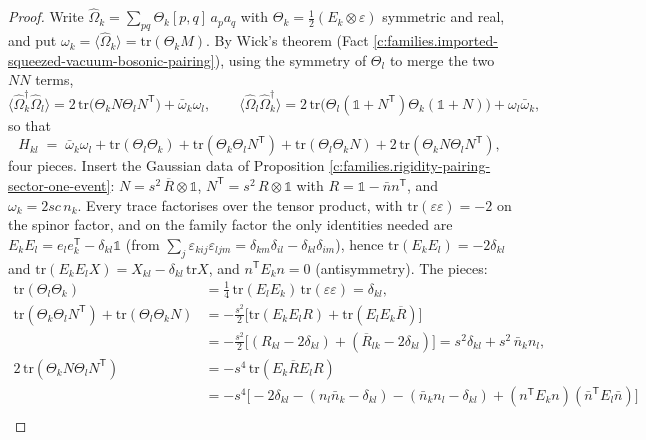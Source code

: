 \documentclass[11pt]{article}
\theoremstyle{definition}
\theoremstyle{plain}
\begin{document}
\begin{proof}
Write $\hat\Omega_{k} = \sum_{pq}\Theta_{k}[p,q]\,a_{p}a_{q}$ with $\Theta_{k} = \tfrac12(E_{k} \otimes \varepsilon)$ symmetric and real, and put $\omega_{k} = \langle\hat\Omega_{k}\rangle = \mathrm{tr}(\Theta_{k}M)$. By Wick's theorem (Fact \ref{c:families.imported-squeezed-vacuum-bosonic-pairing}), using the symmetry of $\Theta_{l}$ to merge the two $NN$ terms,
\[
\langle\hat\Omega_{k}^{\dagger}\hat\Omega_{l}\rangle = 2\,\mathrm{tr}\bigl(\Theta_{k}N\Theta_{l}N^{\mathsf{T}}\bigr) + \bar\omega_{k}\omega_{l}, \qquad
\langle\hat\Omega_{l}\hat\Omega_{k}^{\dagger}\rangle = 2\,\mathrm{tr}\bigl(\Theta_{l}(\mathbb{1}+N^{\mathsf{T}})\Theta_{k}(\mathbb{1}+N)\bigr) + \omega_{l}\bar\omega_{k},
\]
so that
\[
H_{kl} \;=\; \bar\omega_{k}\omega_{l} + \mathrm{tr}(\Theta_{l}\Theta_{k}) + \mathrm{tr}(\Theta_{k}\Theta_{l}N^{\mathsf{T}}) + \mathrm{tr}(\Theta_{l}\Theta_{k}N) + 2\,\mathrm{tr}(\Theta_{k}N\Theta_{l}N^{\mathsf{T}}),
\]
four pieces. Insert the Gaussian data of Proposition \ref{c:families.rigidity-pairing-sector-one-event}: $N = s^{2}\,\overline{R} \otimes \mathbb{1}$, $N^{\mathsf{T}} = s^{2}\,R \otimes \mathbb{1}$ with $R = \mathbb{1} - \bar{n}n^{\mathsf{T}}$, and $\omega_{k} = 2sc\,n_{k}$. Every trace factorises over the tensor product, with $\mathrm{tr}(\varepsilon\varepsilon) = -2$ on the spinor factor, and on the family factor the only identities needed are $E_{k}E_{l} = e_{l}e_{k}^{\mathsf{T}} - \delta_{kl}\mathbb{1}$ (from $\sum_{j}\varepsilon_{kij}\varepsilon_{ljm} = \delta_{km}\delta_{il} - \delta_{kl}\delta_{im}$), hence $\mathrm{tr}(E_{k}E_{l}) = -2\delta_{kl}$ and $\mathrm{tr}(E_{k}E_{l}X) = X_{kl} - \delta_{kl}\,\mathrm{tr}X$, and $n^{\mathsf{T}}E_{k}n = 0$ (antisymmetry). The pieces:
\begin{align*}
\mathrm{tr}(\Theta_{l}\Theta_{k}) &= \tfrac14\,\mathrm{tr}(E_{l}E_{k})\,\mathrm{tr}(\varepsilon\varepsilon) = \delta_{kl},\\
\mathrm{tr}(\Theta_{k}\Theta_{l}N^{\mathsf{T}}) + \mathrm{tr}(\Theta_{l}\Theta_{k}N) &= -\tfrac{s^{2}}{2}\bigl[\mathrm{tr}(E_{k}E_{l}R) + \mathrm{tr}(E_{l}E_{k}\overline{R})\bigr]\\
&= -\tfrac{s^{2}}{2}\bigl[(R_{kl} - 2\delta_{kl}) + (\overline{R}_{lk} - 2\delta_{kl})\bigr] = s^{2}\delta_{kl} + s^{2}\,\bar{n}_{k}n_{l},\\
2\,\mathrm{tr}(\Theta_{k}N\Theta_{l}N^{\mathsf{T}}) &= -s^{4}\,\mathrm{tr}(E_{k}\overline{R}E_{l}R)\\
&= -s^{4}\bigl[-2\delta_{kl} - (n_{l}\bar{n}_{k} - \delta_{kl}) - (\bar{n}_{k}n_{l} - \delta_{kl}) + (n^{\mathsf{T}}E_{k}n)(\bar{n}^{\mathsf{T}}E_{l}\bar{n})\bigr]\\

\end{align*}
\end{proof}
\end{document}
